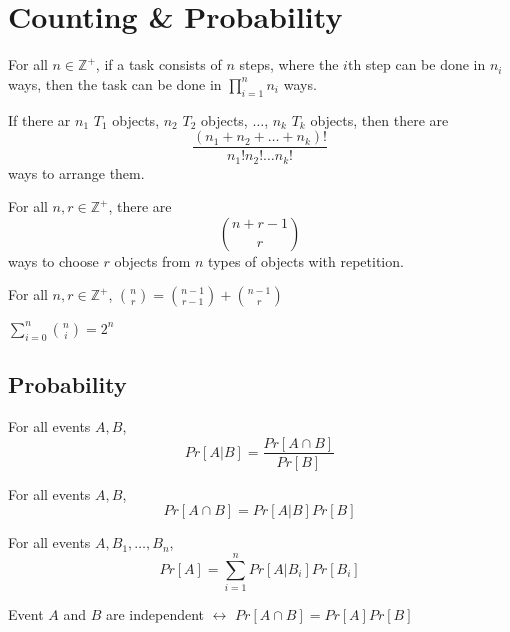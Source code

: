 \section{Counting \& Probability}
\begin{theorem}
	For all $n\in \mathbb{Z}^+$, if a task consists of $n$ steps, where the $i$th step can be done in $n_i$ ways, then the task can be done in $\prod_{i=1}^n n_i$ ways.
\end{theorem}

\begin{theorem}
	If there ar $n_1$ $T_1$ objects, $n_2$ $T_2$ objects, $\hdots$, $n_k$ $T_k$ objects, then there are
	$$
	\frac{(n_1 + n_2 + \hdots + n_k)!}{n_1!n_2!\hdots n_k!}
	$$
	ways to arrange them.
\end{theorem}

\begin{theorem}
	For all $n,r\in \mathbb{Z}^+$, there are
	$$
	\binom{n+r-1}{r}
	$$
	ways to choose $r$ objects from $n$ types of objects with repetition.
\end{theorem}

\begin{theorem}
	For all $n,r\in \mathbb{Z}^+$, $\binom{n}{r} = \binom{n-1}{r-1} + \binom{n-1}{r}$
\end{theorem}

\begin{theorem}
	$\sum_{i=0}^n \binom{n}{i} = 2^n$
\end{theorem}

\subsection*{Probability}
\begin{theorem}
	For all events $A,B$,
	$$
	Pr[A|B] = \frac{Pr[A\cap B]}{Pr[B]}
	$$
\end{theorem}

\begin{corollary}
	For all events $A,B$,
	$$
	Pr[A\cap B] = Pr[A|B]Pr[B]
	$$
\end{corollary}

\begin{theorem}
	For all events $A,B_1,\hdots,B_n$,
	$$
	Pr[A] = \sum_{i=1}^n Pr[A|B_i]Pr[B_i]
	$$
\end{theorem}

\begin{theorem}
	Event $A$ and $B$ are independent $\leftrightarrow$ $Pr[A\cap B] = Pr[A]Pr[B]$
\end{theorem}

